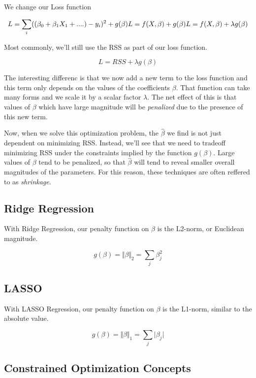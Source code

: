 \documentclass[]{article}
\begin{document}
We change our Loss function

\[
L = \sum_i (\left( \beta_0 + \beta_1 X_1 + .... \right) - y_i)^2 + g(\beta) \\
L = f(X, \beta) + g(\beta) \\ 
L = f(X, \beta) + \lambda g(\beta) \\ 
\]

Most commonly, we'll still use the RSS as part of our loss function.

\[
L = RSS + \lambda g(\beta)
\]

The interesting differenc is that we now add a new term to the loss
function and this term only depends on the values of the coefficients
\(\beta\). That function can take many forms and we scale it by a scalar
factor \(\lambda\). The net effect of this is that values of \(\beta\)
which have large magnitude will be \emph{penalized} due to the presence
of this new term.

Now, when we solve this optimization problem, the \(\hat{\beta}\) we
find is not just dependent on minimizing RSS. Instead, we'll see that we
need to tradeoff minimizing RSS under the constraints implied by the
function \(g(\beta)\). Large values of \(\beta\) tend to be penalized,
so that \(\hat{\beta}\) will tend to reveal smaller overall magnitudes
of the parameters. For this reason, these techniques are often reffered
to as \emph{shrinkage}.

\subsection{Ridge Regression}\label{ridge-regression}

With Ridge Regression, our penalty function on \(\beta\) is the L2-norm,
or Euclidean magnitude.

\[
g(\beta) = \Vert \beta \Vert _2 = \sum_j \beta_j ^2
\]

\subsection{LASSO}\label{lasso}

With LASSO Regression, our penalty function on \(\beta\) is the L1-norm,
similar to the absolute value.

\[
g(\beta) = \Vert \beta \Vert _1 = \sum_j \lvert \beta_j \rvert
\]

\subsection{Constrained Optimization
Concepts}\label{constrained-optimization-concepts}
\end{document}
